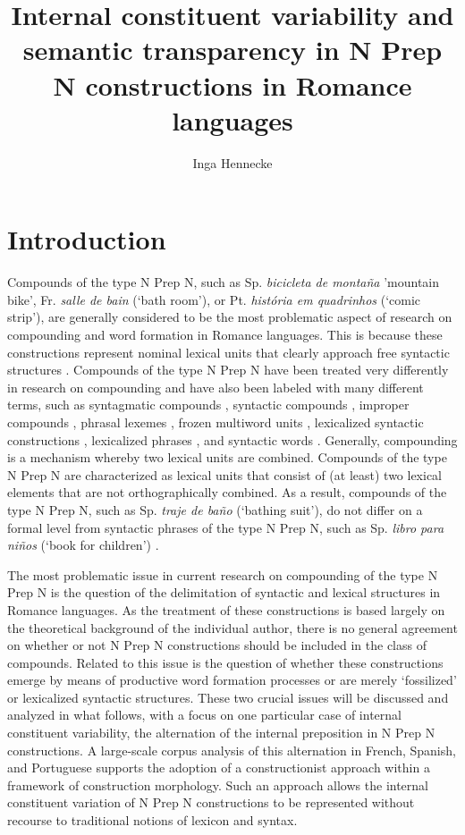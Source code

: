 \documentclass[output=paper]{langsci/langscibook}
\title{Internal constituent variability and semantic transparency in N Prep N constructions in Romance languages}
\author{Inga Hennecke\affiliation{University of Tübingen}}
\begin{document}
\maketitle
\section{Introduction} 
Compounds of the type N Prep N, such as Sp. \textit{bicicleta de montaña} 'mountain bike', Fr. \textit{salle de bain} (`bath room'), or Pt. \textit{história em quadrinhos} (`comic strip'), are generally considered to be the most problematic aspect of research on compounding and word formation in Romance languages. This is because these constructions represent nominal lexical units that clearly approach free syntactic structures \citep{BustosGisbert:1986}. Compounds of the type N Prep N have been treated very differently in research on compounding and have also been labeled with many different terms, such as syntagmatic compounds \citep{BuenafuentesdelaMata:2010}, syntactic compounds \citep{RioTorto:2009}, improper compounds \citep{Kornfeld:2009}, phrasal lexemes \citep{Masini:2007}, frozen multiword units \citep{Guevara:2012}, lexicalized syntactic constructions \citep{Villoing:2012}, lexicalized phrases \citep{Fradin:2009}, and syntactic words \citep{DiSciullo:1987}. Gen\citep{Guevara:2012}erally, compounding is a mechanism whereby two lexical units are combined. Compounds of the type N Prep N are characterized as lexical units that consist of (at least) two lexical elements that are not orthographically combined. As a result, compounds of the type N Prep N, such as Sp. \textit{traje de baño} (`bathing suit'), do not differ on a formal level from syntactic phrases of the type N Prep N, such as Sp. \textit{libro para niños} (`book for children') \citep[69]{BustosGisbert:1986}.

The most problematic issue in current research on compounding of the type N Prep N is the question of the delimitation of syntactic and lexical structures in Romance languages. As the treatment of these constructions is based largely on the theoretical background of the individual author, there is no general agreement on whether or not N Prep N constructions should be included in the class of compounds. Related to this issue is the question of whether these constructions emerge by means of productive word formation processes or are merely `fossilized' or lexicalized syntactic structures. These two crucial issues will be discussed and analyzed in what follows, with a focus on one particular case of internal constituent variability, the alternation of the internal preposition in N Prep N constructions. A large-scale corpus analysis of this alternation in French, Spanish, and Portuguese supports the adoption of a constructionist approach within a framework of construction morphology. Such an approach allows the internal constituent variation of N Prep N constructions to be represented without recourse to traditional notions of lexicon and syntax.
\end{document}
